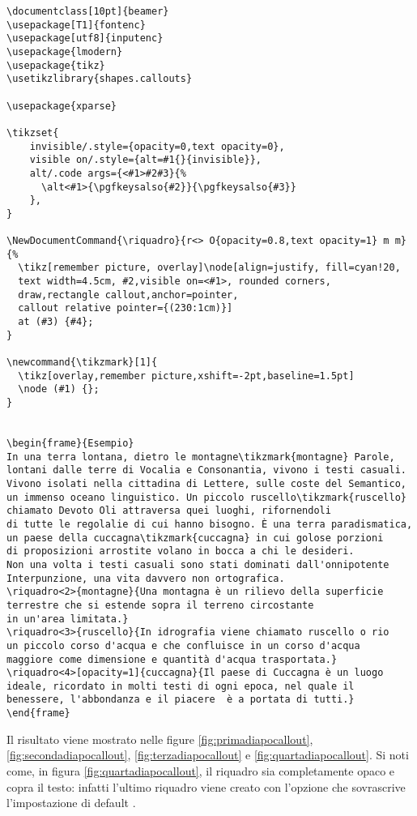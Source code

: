 \begin{lstlisting}[frame=lines]
\documentclass[10pt]{beamer}
\usepackage[T1]{fontenc}
\usepackage[utf8]{inputenc}
\usepackage{lmodern}
\usepackage{tikz}
\usetikzlibrary{shapes.callouts}

\usepackage{xparse}

\tikzset{
    invisible/.style={opacity=0,text opacity=0},
    visible on/.style={alt=#1{}{invisible}},
    alt/.code args={<#1>#2#3}{%
      \alt<#1>{\pgfkeysalso{#2}}{\pgfkeysalso{#3}}
    },
}

\NewDocumentCommand{\riquadro}{r<> O{opacity=0.8,text opacity=1} m m}
{%
  \tikz[remember picture, overlay]\node[align=justify, fill=cyan!20, 
  text width=4.5cm, #2,visible on=<#1>, rounded corners,
  draw,rectangle callout,anchor=pointer,
  callout relative pointer={(230:1cm)}]
  at (#3) {#4};
}

\newcommand{\tikzmark}[1]{
  \tikz[overlay,remember picture,xshift=-2pt,baseline=1.5pt] 
  \node (#1) {};
}


\begin{frame}{Esempio}
In una terra lontana, dietro le montagne\tikzmark{montagne} Parole, 
lontani dalle terre di Vocalia e Consonantia, vivono i testi casuali. 
Vivono isolati nella cittadina di Lettere, sulle coste del Semantico, 
un immenso oceano linguistico. Un piccolo ruscello\tikzmark{ruscello} 
chiamato Devoto Oli attraversa quei luoghi, rifornendoli 
di tutte le regolalie di cui hanno bisogno. È una terra paradismatica, 
un paese della cuccagna\tikzmark{cuccagna} in cui golose porzioni 
di proposizioni arrostite volano in bocca a chi le desideri. 
Non una volta i testi casuali sono stati dominati dall'onnipotente 
Interpunzione, una vita davvero non ortografica.
\riquadro<2>{montagne}{Una montagna è un rilievo della superficie 
terrestre che si estende sopra il terreno circostante 
in un'area limitata.}
\riquadro<3>{ruscello}{In idrografia viene chiamato ruscello o rio 
un piccolo corso d'acqua e che confluisce in un corso d'acqua 
maggiore come dimensione e quantità d'acqua trasportata.}
\riquadro<4>[opacity=1]{cuccagna}{Il paese di Cuccagna è un luogo 
ideale, ricordato in molti testi di ogni epoca, nel quale il 
benessere, l'abbondanza e il piacere  è a portata di tutti.}
\end{frame}

\end{lstlisting}

Il risultato viene mostrato nelle figure \ref{fig:primadiapocallout}, \ref{fig:secondadiapocallout}, \ref{fig:terzadiapocallout} e \ref{fig:quartadiapocallout}. Si noti come, in figura \ref{fig:quartadiapocallout}, il riquadro sia completamente opaco e copra il testo: infatti l'ultimo riquadro viene creato con l'opzione  che sovrascrive l'impostazione di default .

